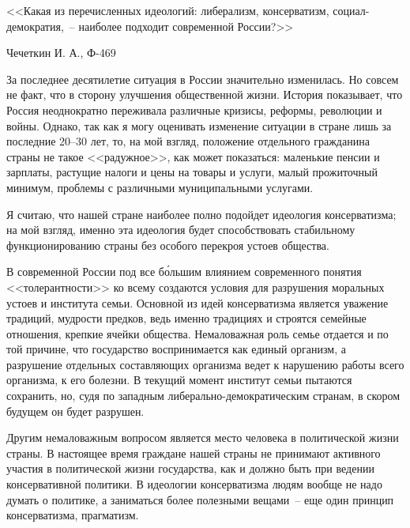 \documentclass[pscyr,notitlepage]{hedwork}
\begin{document}
  \onehalfspacing
  \begin{center}
    <<Какая из перечисленных идеологий: либерализм, консерватизм,
      социал-демократия,~-- наиболее подходит современной России?>>
  \end{center}  
  \vspace{-2em}
  \begin{flushright}
    Чечеткин И. А., Ф-469
  \end{flushright}

  За последнее десятилетие ситуация в России значительно изменилась. Но совсем
  не факт, что в сторону улучшения общественной жизни. История показывает, что
  Россия неоднократно переживала различные кризисы, реформы, революции и войны.
  Однако, так как я могу оценивать изменение ситуации в стране лишь за последние
  20--30 лет, то, на мой взгляд, положение отдельного гражданина страны не такое
  <<радужное>>, как может показаться: маленькие пенсии и зарплаты, растущие
  налоги и цены на товары и услуги, малый прожиточный минимум, проблемы с
  различными муниципальными услугами.

  Я считаю, что нашей стране наиболее полно подойдет идеология консерватизма; на
  мой взгляд, именно эта идеология будет способствовать стабильному
  функционированию страны без особого перекроя устоев общества.

  В современной России под все б\'{о}льшим влиянием современного понятия
  <<толерантности>> ко всему создаются условия для разрушения моральных устоев и
  института семьи. Основной из идей консерватизма является уважение традиций,
  мудрости предков, ведь именно традициях и строятся семейные отношения, крепкие
  ячейки общества. Немаловажная роль семье отдается и по той причине, что
  государство воспринимается как единый организм, а разрушение отдельных
  составляющих организма ведет к нарушению работы всего организма, к его
  болезни. В текущий момент институт семьи пытаются сохранить, но, судя по
  западным либерально-демократическим странам, в скором будущем он будет
  разрушен.

  Другим немаловажным вопросом является место человека в политической жизни
  страны. В настоящее время граждане нашей страны не принимают активного участия
  в политической жизни государства, как и должно быть при ведении консервативной
  политики. В идеологии консерватизма людям вообще не надо думать о политике, а
  заниматься более полезными вещами~-- еще один принцип консерватизма,
  прагматизм.
\end{document}
